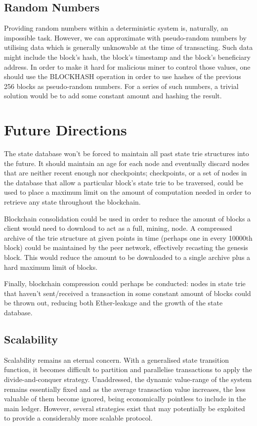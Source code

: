 \documentclass[9pt,oneside]{amsart}
\begin{document}
\begin{multicols}{2}
\subsection{Random Numbers}
Providing random numbers within a deterministic system is, naturally, an impossible task. However, we can approximate with pseudo-random numbers by utilising data which is generally unknowable at the time of transacting. Such data might include the block's hash, the block's timestamp and the block's beneficiary address. In order to make it hard for malicious miner to control those values, one should use the {\small BLOCKHASH} operation in order to use hashes of the previous 256 blocks as pseudo-random numbers. For a series of such numbers, a trivial solution would be to add some constant amount and hashing the result.

\section{Future Directions} \label{ch:future}

The state database won't be forced to maintain all past state trie structures into the future. It should maintain an age for each node and eventually discard nodes that are neither recent enough nor checkpoints; checkpoints, or a set of nodes in the database that allow a particular block's state trie to be traversed, could be used to place a maximum limit on the amount of computation needed in order to retrieve any state throughout the blockchain.

Blockchain consolidation could be used in order to reduce the amount of blocks a client would need to download to act as a full, mining, node. A compressed archive of the trie structure at given points in time (perhaps one in every 10000th block) could be maintained by the peer network, effectively recasting the genesis block. This would reduce the amount to be downloaded to a single archive plus a hard maximum limit  of blocks.

Finally, blockchain compression could perhaps be conducted: nodes in state trie that haven't sent/received a transaction in some constant amount of blocks could be thrown out, reducing both Ether-leakage and the growth of the state database.

\subsection{Scalability}

Scalability remains an eternal concern. With a generalised state transition function, it becomes difficult to partition and parallelise transactions to apply the divide-and-conquer strategy. Unaddressed, the dynamic value-range of the system remains essentially fixed and as the average transaction value increases, the less valuable of them become ignored, being economically pointless to include in the main ledger. However, several strategies exist that may potentially be exploited to provide a considerably more scalable protocol.


\end{multicols}
\end{document}
